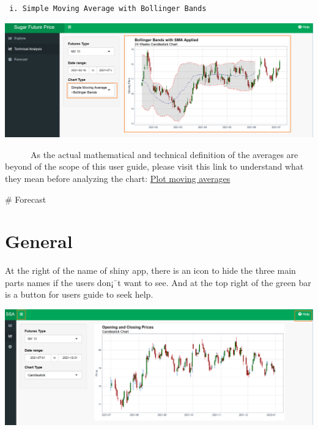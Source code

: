 \documentclass[
  12pt,
]{article}
\begin{document}
\begin{verbatim}
 i. Simple Moving Average with Bollinger Bands 
\end{verbatim}

\begin{center}\includegraphics[width=1\linewidth]{images/TA_6} \end{center}

~~~~~~As the actual mathematical and technical definition of the
averages are beyond of the scope of this user guide, please visit this
link to understand what they mean before analyzing the chart:
\href{https://business-science.github.io/tidyquant/reference/geom_ma.html}{Plot
moving averages}

\# Forecast

\hypertarget{general}{%
\section{General}\label{general}}

At the right of the name of shiny app, there is an icon to hide the
three main parts names if the users don¡¯t want to see. And at the top
right of the green bar is a button for users guide to seek help.

\begin{center}\includegraphics[width=1\linewidth]{images/1} \end{center}
\end{document}
